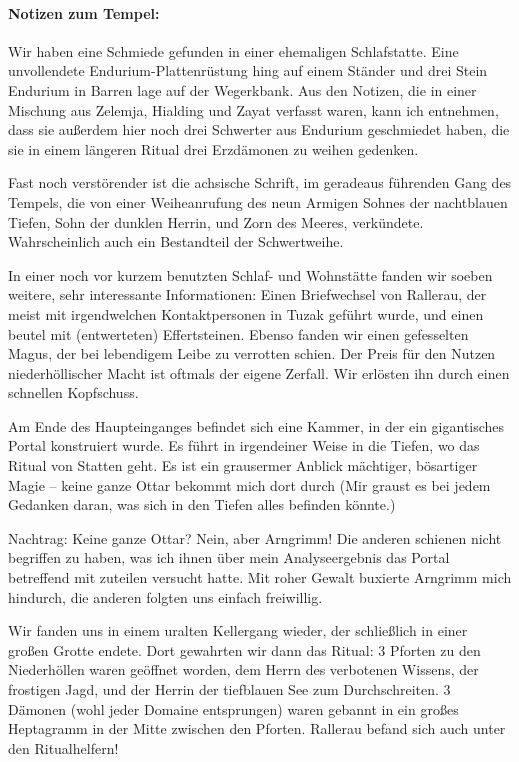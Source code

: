 \paragraph{Notizen zum Tempel:}
Wir haben eine Schmiede gefunden in einer ehemaligen Schlafstatte. Eine unvollendete Endurium-Plattenrüstung hing auf einem Ständer und drei Stein Endurium in Barren lage auf der Wegerkbank. Aus den Notizen, die in einer Mischung aus Zelemja, Hialding und Zayat verfasst waren, kann ich entnehmen, dass sie außerdem hier noch drei Schwerter aus Endurium geschmiedet haben, die sie in einem längeren Ritual drei Erzdämonen zu weihen gedenken.

Fast noch verstörender ist die achsische Schrift, im geradeaus führenden Gang des Tempels, die von einer Weiheanrufung des neun Armigen Sohnes der nachtblauen Tiefen, Sohn der dunklen Herrin, und Zorn des Meeres, verkündete. Wahrscheinlich auch ein Bestandteil der Schwertweihe.

In einer noch vor kurzem benutzten Schlaf- und Wohnstätte fanden wir soeben weitere, sehr interessante Informationen:
Einen Briefwechsel von Rallerau, der meist mit irgendwelchen Kontaktpersonen in Tuzak geführt wurde, und einen beutel mit (entwerteten) Effertsteinen.
Ebenso fanden wir einen gefesselten Magus, der bei lebendigem Leibe zu verrotten schien. Der Preis für den Nutzen niederhöllischer Macht ist oftmals der eigene Zerfall.
 Wir erlösten ihn durch einen schnellen Kopfschuss.

Am Ende des Haupteinganges befindet sich eine Kammer, in der ein gigantisches Portal konstruiert wurde. Es führt in irgendeiner Weise in die Tiefen, wo das Ritual von Statten geht. Es ist ein grausermer Anblick mächtiger, bösartiger Magie -- keine ganze Ottar bekommt mich dort durch (Mir graust es bei jedem Gedanken daran, was sich in den Tiefen alles befinden könnte.)

Nachtrag: Keine ganze Ottar? Nein, aber Arngrimm! Die anderen schienen nicht begriffen zu haben, was ich ihnen über mein Analyseergebnis das Portal betreffend mit zuteilen versucht hatte. Mit roher Gewalt buxierte Arngrimm mich hindurch, die anderen folgten uns einfach freiwillig.

Wir fanden uns in einem uralten Kellergang wieder, der schließlich in einer großen Grotte endete. Dort gewahrten wir dann das Ritual:
3 Pforten zu den Niederhöllen waren geöffnet worden, dem Herrn des verbotenen Wissens, der frostigen Jagd, und der Herrin der tiefblauen See zum Durchschreiten. 3 Dämonen (wohl jeder Domaine entsprungen) waren gebannt in ein großes Heptagramm in der Mitte zwischen den Pforten.
Rallerau befand sich auch unter den Ritualhelfern!

